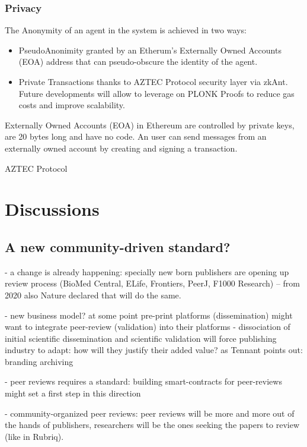 \documentclass[runningheads]{llncs}
\begin{document}
\subsubsection{Privacy}

The Anonymity of an agent in the system is achieved in two ways:

\begin{itemize}
  \item PseudoAnonimity granted by an Etherum's Externally Owned Accounts (EOA) address that can pseudo-obscure the identity of the agent.
  \item Private Transactions thanks to AZTEC Protocol security layer via zkAnt. Future developments will allow to leverage on PLONK Proofs to reduce gas costs and improve scalability.
\end{itemize}

\newline Externally Owned Accounts (EOA) in Ethereum are controlled by private keys, are 20 bytes long and have no code. An user can send messages from an externally owned account by creating and signing a transaction.
\newline

\newline AZTEC Protocol

\section{Discussions}
\subsection{A new community-driven standard?}
- a change is already happening: specially new born publishers are opening up review process (BioMed Central, ELife, Frontiers, PeerJ, F1000 Research) -- from 2020 also Nature declared that will do the same.

- new business model? at some point pre-print platforms (dissemination) might want to integrate peer-review (validation) into their platforms - dissociation of initial scientific dissemination and scientific validation will force publishing industry to adapt: how will they justify their added value? as Tennant points out: branding archiving

- peer reviews requires a standard: building smart-contracts for peer-reviews might set a first step in this direction

- community-organized peer  reviews: peer reviews will be more and more out of the hands of publishers, researchers will be the ones seeking the papers to review (like in Rubriq).
\end{document}
